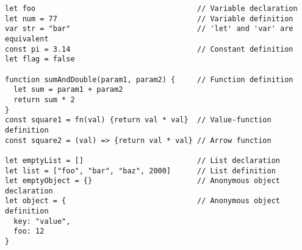 \vspace{-2.25em}
\begin{center}
\begin{minipage}[t]{1\textwidth}
\begin{listing}[H]
\begin{spacing}{0.6}
\begin{verbatim}
let foo                                     // Variable declaration
let num = 77                                // Variable definition
var str = "bar"                             // 'let' and 'var' are equivalent
const pi = 3.14                             // Constant definition
let flag = false

function sumAndDouble(param1, param2) {     // Function definition
  let sum = param1 + param2
  return sum * 2
}
const square1 = fn(val) {return val * val}  // Value-function definition
const square2 = (val) => {return val * val} // Arrow function

let emptyList = []                          // List declaration
let list = ["foo", "bar", "baz", 2000]      // List definition
let emptyObject = {}                        // Anonymous object declaration
let object = {                              // Anonymous object definition
  key: "value",
  foo: 12
}
\end{verbatim}
\end{spacing}
\end{listing}
\end{minipage}
\end{center}
